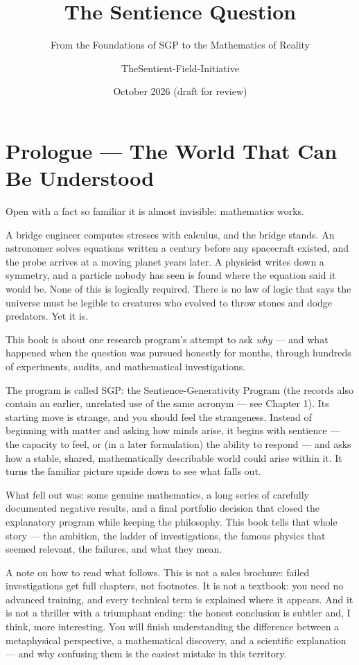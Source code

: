 \documentclass[
  11pt,
]{book}
\title{The Sentience Question}
\subtitle{From the Foundations of SGP to the Mathematics of Reality}
\author{TheSentient-Field-Initiative}
\date{October 2026 (draft for review)}
\begin{document}
\frontmatter
\maketitle

{
\setcounter{tocdepth}{2}
\tableofcontents
}
\mainmatter
\chapter{Prologue --- The World That Can Be
Understood}\label{prologue-the-world-that-can-be-understood}

Open with a fact so familiar it is almost invisible: mathematics works.

A bridge engineer computes stresses with calculus, and the bridge
stands. An astronomer solves equations written a century before any
spacecraft existed, and the probe arrives at a moving planet years
later. A physicist writes down a symmetry, and a particle nobody has
seen is found where the equation said it would be. None of this is
logically required. There is no law of logic that says the universe must
be legible to creatures who evolved to throw stones and dodge predators.
Yet it is.

This book is about one research program's attempt to ask \emph{why} ---
and what happened when the question was pursued honestly for months,
through hundreds of experiments, audits, and mathematical
investigations.

The program is called SGP: the Sentience-Generativity Program (the
records also contain an earlier, unrelated use of the same acronym ---
see Chapter 1). Its starting move is strange, and you should feel the
strangeness. Instead of beginning with matter and asking how minds
arise, it begins with sentience --- the capacity to feel, or (in a later
formulation) the ability to respond --- and asks how a stable, shared,
mathematically describable world could arise within it. It turns the
familiar picture upside down to see what falls out.

What fell out was: some genuine mathematics, a long series of carefully
documented negative results, and a final portfolio decision that closed
the explanatory program while keeping the philosophy. This book tells
that whole story --- the ambition, the ladder of investigations, the
famous physics that seemed relevant, the failures, and what they mean.

A note on how to read what follows. This is not a sales brochure: failed
investigations get full chapters, not footnotes. It is not a textbook:
you need no advanced training, and every technical term is explained
where it appears. And it is not a thriller with a triumphant ending: the
honest conclusion is subtler and, I think, more interesting. You will
finish understanding the difference between a metaphysical perspective,
a mathematical discovery, and a scientific explanation --- and why
confusing them is the easiest mistake in this territory.
\end{document}
